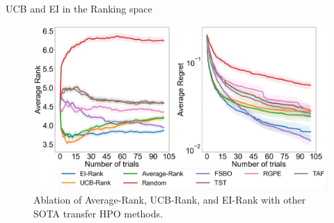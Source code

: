 \documentclass{beamer}
\begin{document}
\begin{frame}[t]{UCB and EI in the Ranking space}
\begin{figure}[h]
  \centering
    \includegraphics[scale=0.20]{images/acqusitionRanking}
    \caption{Ablation of Average-Rank, UCB-Rank, and EI-Rank with other SOTA transfer HPO methods.}
    \label{fig:acqusitionRanking}
\end{figure}

\end{frame}
\end{document}
